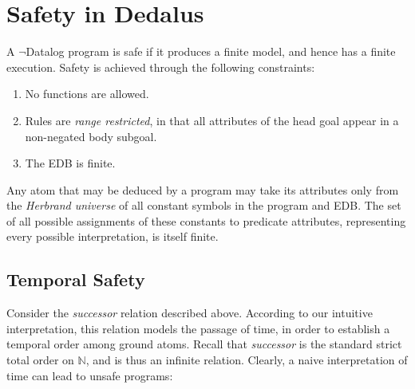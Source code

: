 \section{Safety in Dedalus}

A $\lnot$Datalog program is safe if it produces a finite model, and hence has a finite execution.  Safety is achieved through the following
constraints:

\begin{enumerate}
\item No functions are allowed.
\item Rules are \emph{range restricted}, in that all attributes of the head goal appear in a non-negated body subgoal.
\item The EDB is finite.
\end{enumerate}

Any atom that may be deduced by a program may take its attributes only from the \emph{Herbrand universe} of
all constant symbols in the program and EDB.  The set of all possible assignments of these constants to predicate attributes,
representing every possible interpretation, is itself finite. 

\subsection{Temporal Safety}

Consider the \emph{successor} relation described above.  According to our intuitive interpretation, this relation models
the passage of time, in order to establish a temporal order among ground atoms.  
Recall that {\em successor} is the standard strict total order on $\mathbb{N}$,
and is thus an infinite relation.  Clearly, a naive interpretation of time can
lead to unsafe programs:






